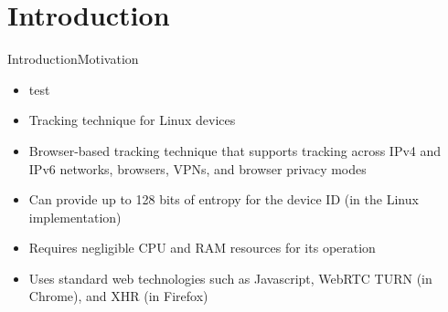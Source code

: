 \documentclass[aspectratio=169, hyperref={colorlinks=true, allcolors=SecondaryColor}, c]{beamer}
\begin{document}
\ifbeamer
\begin{withoutheadline}
	\begin{withoutfootline}
		\begin{frame}
			\titlepagesecond
		\end{frame}
	\end{withoutfootline}

\end{withoutheadline}
\fi

\setcounter{section}{0}

\section{Introduction}

\begin{frame}[fragile]{Introduction}{Motivation}
	\ifbeamer
		\begin{itemize}
			\item test
		\end{itemize}
	\else
		\begin{itemize}
			\item Tracking technique for Linux devices
			\item Browser-based tracking technique that supports tracking across IPv4 and IPv6 networks, browsers, VPNs, and browser privacy modes
			\item Can provide up to 128 bits of entropy for the device ID (in the Linux implementation)
			\item Requires negligible CPU and RAM resources for its operation
			\item Uses standard web technologies such as Javascript, WebRTC TURN (in Chrome), and XHR (in Firefox)
		\end{itemize}
	\fi
\end{frame}
\end{document}
